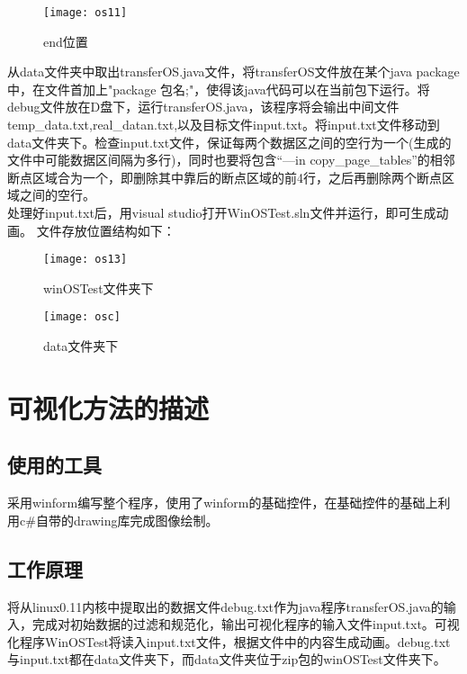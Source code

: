 \documentclass[]{report}
\begin{document}
\begin{figure}[H]%
	\centering  %
	\texttt{[image: os11]}  
	\caption{end位置}  %
	\label{fig15}
\end{figure}

从data文件夹中取出transferOS.java文件，将transferOS文件放在某个java package中，在文件首加上"package 包名;"，使得该java代码可以在当前包下运行。将debug文件放在D盘下，运行transferOS.java，该程序将会输出中间文件temp\_data.txt,real\_datan.txt,以及目标文件input.txt。将input.txt文件移动到data文件夹下。检查input.txt文件，保证每两个数据区之间的空行为一个(生成的文件中可能数据区间隔为多行)，同时也要将包含“---in copy\_page\_tables”的相邻断点区域合为一个，即删除其中靠后的断点区域的前4行，之后再删除两个断点区域之间的空行。\\

处理好input.txt后，用visual studio打开WinOSTest.sln文件并运行，即可生成动画。
文件存放位置结构如下：
\begin{figure}[H]%
	\centering  %
	\texttt{[image: os13]}  
	\caption{winOSTest文件夹下}  %
	\label{fig16}
\end{figure}
\begin{figure}[H]%
	\centering  %
	\texttt{[image: osc]}  
	\caption{data文件夹下}  %
	\label{fig17}
\end{figure}

\chapter{可视化方法的描述}

\section{使用的工具}
采用winform编写整个程序，使用了winform的基础控件，在基础控件的基础上利用c\#自带的drawing库完成图像绘制。

\section{工作原理}
将从linux0.11内核中提取出的数据文件debug.txt作为java程序transferOS.java的输入，完成对初始数据的过滤和规范化，输出可视化程序的输入文件input.txt。可视化程序WinOSTest将读入input.txt文件，根据文件中的内容生成动画。debug.txt与input.txt都在data文件夹下，而data文件夹位于zip包的winOSTest文件夹下。
\end{document}
